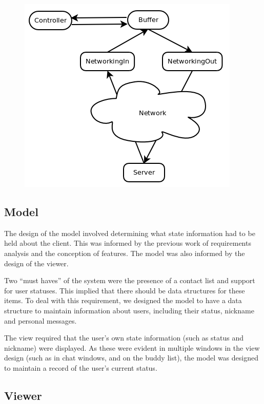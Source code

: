 \begin{figure}
    \begin{center}
        \includegraphics[scale=0.65]{Design/diagrams/buffer.png}
        \label{buffer}
    \end{center}
\end{figure}

\subsection {Model}
\label{model}

The design of the model involved determining what state information had to be held about the client. This was informed by the previous work of requirements analysis and the conception of features. The model was also informed by the design of the viewer.

Two ``must haves'' of the system were the presence of a contact list and support for user statuses. This implied that there should be data structures for these items. To deal with this requirement, we designed the model to have a data structure to maintain information about users, including their status, nickname and personal messages. 

The view required that the user's own state information (such as status and nickname) were displayed. As these were evident in multiple windows in the view design (such as in chat windows, and on the buddy list), the model was designed to maintain a record of the user's current status. 

\subsection {Viewer}

